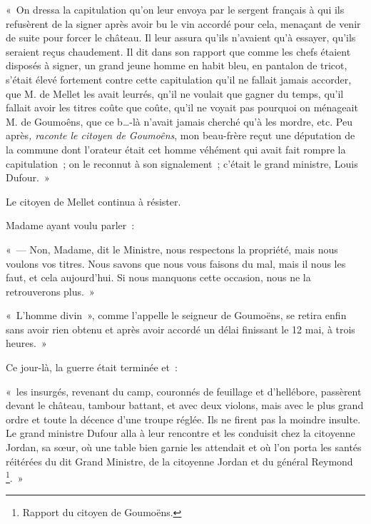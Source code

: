 \documentclass[french,twoside]{book} %
\newenvironment{quoteblock}%
  {\begin{quoting}}
  {\end{quoting}}
\newenvironment{quotebar}{%
    \def\FrameCommand{{\color{rubric!10!}\vrule width 0.5em} \hspace{0.9em}}%
    \def\OuterFrameSep{\itemsep} %
    \MakeFramed {\advance\hsize-\width \FrameRestore}
  }%
  {%
    \endMakeFramed
  }
\renewenvironment{quoteblock}%
  {%
    \savenotes
    \setstretch{0.9}
    \normalfont
    \begin{quotebar}
  }
  {%
    \end{quotebar}
    \spewnotes
  }
\begin{document}
\begin{quoteblock}
 \noindent « On dressa la capitulation qu’on leur envoya par le sergent français à qui ils refusèrent de la signer après avoir bu le vin accordé pour cela, menaçant de venir de suite pour forcer le château. Il leur assura qu’ils n’avaient qu’à essayer, qu’ils seraient reçus chaudement. Il dit dans son rapport que comme les chefs étaient disposés à signer, un grand jeune homme en habit bleu, en pantalon de tricot, s’était élevé fortement contre cette capitulation qu’il ne fallait jamais accorder, que M. de Mellet les avait leurrés, qn’il ne voulait que gagner du temps, qu’il fallait avoir les titres coûte que coûte, qu’il ne voyait pas pourquoi on ménageait M. de Goumoêns, que ce b…-là n’avait jamais cherché qu’à les mordre, etc. Peu après\emph{, raconte le citoyen de Goumoêns}, mon beau-frère reçut une députation de la commune dont l’orateur était cet homme véhément qui avait fait rompre la capitulation ; on le reconnut à son signalement ; c’était le grand ministre, Louis Dufour. »\par
 Le citoyen de Mellet continua à résister.\par
  Madame ayant voulu parler :\par
 « — Non, Madame, dit le Ministre, nous respectons la propriété, mais nous voulons vos titres. Nous savons que nous vous faisons du mal, mais il nous les faut, et cela aujourd’hui. Si nous manquons cette occasion, nous ne la retrouverons plus. »\par
 « L’homme divin », comme l’appelle le seigneur de Goumoëns, se retira enfin sans avoir rien obtenu et après avoir accordé un délai finissant le 12 mai, à trois heures. »
 \end{quoteblock}

\noindent Ce jour-là, la guerre était terminée et :\par

\begin{quoteblock}
\noindent « les insurgés, revenant du camp, couronnés de feuillage et d’hellébore, passèrent devant le château, tambour battant, et avec deux violons, mais avec le plus grand ordre et toute la décence d’une troupe réglée. Ils ne firent pas la moindre insulte. Le grand ministre Dufour alla à leur rencontre et les conduisit chez la citoyenne Jordan, sa sœur, où une table bien garnie les attendait et où l’on porta les santés réitérées du dit Grand Ministre, de la citoyenne Jordan et du général Reymond \footnote{Rapport du citoyen de Goumoëns.}. »\end{quoteblock}
\end{document}
